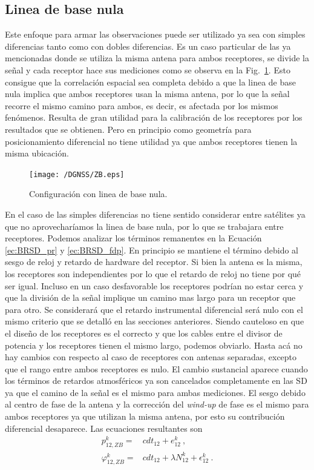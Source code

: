 \documentclass[a4paper,12pt,oneside,onecolumn,final,openright]{book}%
\begin{document}
\subsection{Linea de base nula}
	Este enfoque para armar las observaciones puede ser utilizado ya sea con simples diferencias tanto como con dobles diferencias. Es un caso particular de las ya mencionadas donde se utiliza la misma antena para ambos receptores, se divide la señal y cada receptor hace sus mediciones como se observa en la Fig.~\ref{fig:ZB}. Esto consigue que la correlación espacial sea completa debido a que la linea de base nula implica que ambos receptores usan la misma antena, por lo que la señal recorre el mismo camino para ambos, es decir, es afectada por los mismos fenómenos. Resulta de gran utilidad para la calibración de los receptores por los resultados que se obtienen. Pero en principio como geometría para posicionamiento diferencial no tiene utilidad ya que ambos receptores tienen la misma ubicación.
	
\begin{figure}
    \centering
    \texttt{[image: /DGNSS/ZB.eps]}
    \caption{Configuración con linea de base nula.}
    \label{fig:ZB}
\end{figure}

	En el caso de las simples diferencias no tiene sentido considerar entre satélites ya que no aprovecharíamos la linea de base nula, por lo que se trabajara entre receptores. Podemos analizar los términos remanentes en la Ecuación \eqref{ec:BRSD_pr} y \eqref{ec:BRSD_fdp}. En principio se mantiene el término debido al sesgo de reloj y retardo de hardware del receptor. Si bien la antena es la misma, los receptores son independientes por lo que el retardo de reloj no tiene por qué ser igual. Incluso en un caso desfavorable los receptores podrían no estar cerca y que la división de la señal implique un camino mas largo para un receptor que para otro. Se considerará que el retardo instrumental diferencial será nulo con el mismo criterio que se detalló en las secciones anteriores. Siendo cauteloso en que el diseño de los receptores es el correcto y que los cables entre el divisor de potencia y los receptores tienen el mismo largo, podemos obviarlo. Hasta acá no hay cambios con respecto al caso de receptores con antenas separadas, excepto que el rango entre ambos receptores es nulo. El cambio sustancial aparece cuando los términos de retardos atmosféricos ya son cancelados completamente en las SD ya que el camino de la señal es el mismo para ambas mediciones. El sesgo debido al centro de fase de la antena y la corrección del \textit{wind-up} de fase es el mismo para ambos receptores ya que utilizan la misma antena, por esto su contribución diferencial desaparece. Las ecuaciones resultantes son
\begin{align}
	p_{12,ZB}^k =& cdt_{12} + e_{12}^{k} \ , \\
	\varphi_{12,ZB}^k =& cdt_{12} + \lambda N_{12}^k + \epsilon_{12}^k \ .
\end{align}
	
\end{document}
